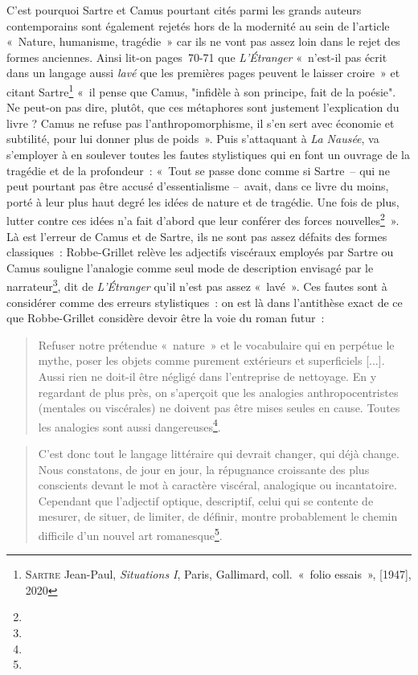 \documentclass[12pt, a4paper]{article}
\begin{document}
C'est pourquoi Sartre et Camus pourtant cités parmi les grands auteurs contemporains sont également rejetés hors de la modernité au sein de l'article «~Nature, humanisme, tragédie~» car ils ne vont pas assez loin dans le rejet des formes anciennes. Ainsi lit-on pages~70-71 que \textit{L'Étranger} «~n’est-il pas écrit dans un langage aussi \textit{lavé} que les premières pages peuvent le laisser croire~» et citant Sartre\footnote{\textsc{Sartre} Jean-Paul, \textit{Situations I}, Paris, Gallimard, coll.~«~folio essais~», [1947], 2020} «~il pense que Camus, "infidèle à son principe, fait de la poésie". Ne peut-on pas dire, plutôt, que ces métaphores sont justement l’explication du livre ? Camus ne refuse pas l’anthropomorphisme, il s’en sert avec économie et subtilité, pour lui donner plus de poids~». Puis s'attaquant à \textit{La Nausée}, \robbe{} va s'employer à en soulever toutes les fautes stylistiques qui en font un ouvrage de la tragédie et de la profondeur~: «~Tout se passe donc comme si Sartre~– qui ne peut pourtant pas être accusé d’essentialisme –~avait, dans ce livre du moins, porté à leur plus haut degré les idées de nature et de tragédie. Une fois de plus, lutter contre ces idées n’a fait d’abord que leur conférer des forces nouvelles\footnote{}~».
Là est l'erreur de Camus et de Sartre, ils ne sont pas assez défaits des formes classiques~: Robbe-Grillet relève les adjectifs viscéraux employés par Sartre ou Camus souligne l'analogie comme seul mode de description envisagé par le narrateur\footnote{}, dit de \textit{L'Étranger} qu'il n'est pas assez «~lavé~». Ces fautes sont à considérer comme des erreurs stylistiques~: on est là dans l'antithèse exact de ce que Robbe-Grillet considère devoir être la voie du roman futur~:

\begin{quote}
    Refuser notre prétendue «~nature~» et le vocabulaire qui en perpétue le mythe, poser les objets comme purement extérieurs et superficiels [...]. Aussi rien ne doit-il être négligé dans l’entreprise de nettoyage. En y regardant de plus près, on s’aperçoit que les analogies anthropocentristes (mentales ou viscérales) ne doivent pas être mises seules en cause. Toutes les analogies sont aussi dangereuses\footnote{}.
\end{quote}

\begin{quote}
    C’est donc tout le langage littéraire qui devrait changer, qui déjà change. Nous constatons, de jour en jour, la répugnance croissante des plus conscients devant le mot à caractère viscéral, analogique ou incantatoire. Cependant que l’adjectif optique, descriptif, celui qui se contente de mesurer, de situer, de limiter, de définir, montre probablement le chemin difficile d’un nouvel art romanesque\footnote{}.
\end{quote}
\end{document}
